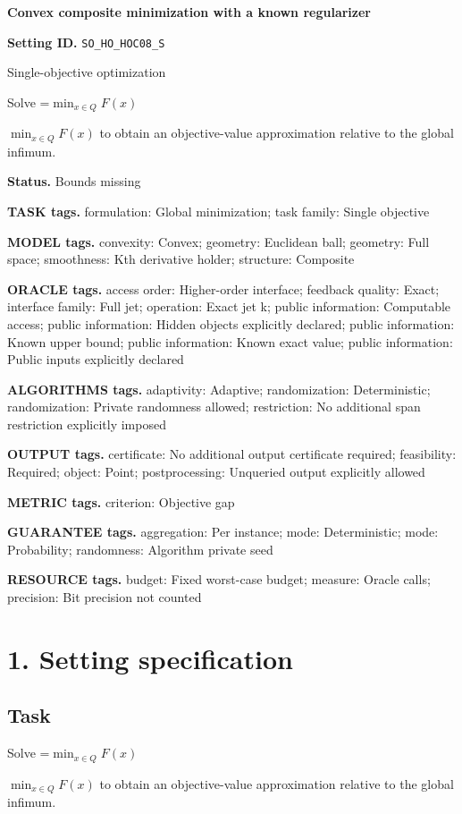\documentclass[10pt,a4paper]{article}
\newcommand{\AtlasMath}[1]{\par\begingroup\centering\setbox0=\hbox{$\displaystyle #1$}\ifdim\wd0>1.4\linewidth\typeout{ATLAS WIDE FORMULA: \the\wd0}\fi\ifdim\wd0>\linewidth\resizebox{\linewidth}{!}{\box0}\else\box0\fi\par\endgroup}
\newcommand{\AtlasInlineMath}[1]{\begingroup\setbox0=\hbox{$#1$}\ifdim\wd0>.4\linewidth\endgroup\AtlasMath{#1}\else\endgroup$#1$\fi}
\begin{document}
\raggedright

{\LARGE\bfseries\sffamily\color{AtlasNavy} Convex composite minimization with a known regularizer\par}\vspace{5pt}
\textbf{Setting ID.} \texttt{SO\_\allowbreak{}HO\_\allowbreak{}HOC08\_\allowbreak{}S}

Single-objective optimization

Solve \AtlasInlineMath{\min_{x\in Q}F(x)} to obtain an objective-value approximation relative to the global infimum.

\textbf{Status.} Bounds missing

\textbf{TASK tags.} formulation: Global minimization; task family: Single objective

\textbf{MODEL tags.} convexity: Convex; geometry: Euclidean ball; geometry: Full space; smoothness: Kth derivative holder; structure: Composite

\textbf{ORACLE tags.} access order: Higher-order interface; feedback quality: Exact; interface family: Full jet; operation: Exact jet k; public information: Computable access; public information: Hidden objects explicitly declared; public information: Known upper bound; public information: Known exact value; public information: Public inputs explicitly declared

\textbf{ALGORITHMS tags.} adaptivity: Adaptive; randomization: Deterministic; randomization: Private randomness allowed; restriction: No additional span restriction explicitly imposed

\textbf{OUTPUT tags.} certificate: No additional output certificate required; feasibility: Required; object: Point; postprocessing: Unqueried output explicitly allowed

\textbf{METRIC tags.} criterion: Objective gap

\textbf{GUARANTEE tags.} aggregation: Per instance; mode: Deterministic; mode: Probability; randomness: Algorithm private seed

\textbf{RESOURCE tags.} budget: Fixed worst-case budget; measure: Oracle calls; precision: Bit precision not counted

\section{1. Setting specification}
\subsection{Task}
Solve \AtlasInlineMath{\min_{x\in Q}F(x)} to obtain an objective-value approximation relative to the global infimum.
\end{document}
